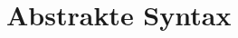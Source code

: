\section{Abstrakte Syntax} %
\label{sec:abstrakte_syntax}
\begin{center}
    ~\newpage

\end{center}
